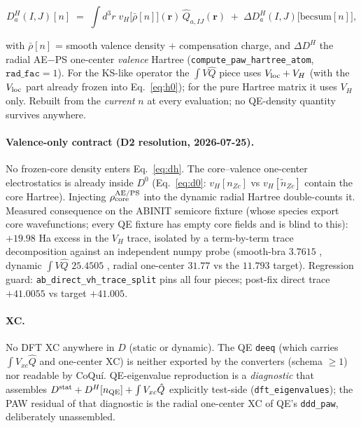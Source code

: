 \documentclass[11pt]{article}
\newcommand{\code}[1]{\texttt{#1}}
\newcommand{\Dstat}{D^{\rm stat}}
\newcommand{\Qhat}{\hat{Q}}
\newcommand{\becsum}{\mathrm{becsum}}
\begin{document}
\begin{keybox}
\begin{equation}
D^{H}_{a}(I,J)[n] \;=\;
\int \! d^3r\; v_H\big[\bar\rho[n]\big](\mathbf{r})\, \Qhat_{a,IJ}(\mathbf{r})
\;+\; \Delta D^{H}_{a}(I,J)\big[\becsum[n]\big],
\label{eq:dh}
\end{equation}
\end{keybox}
with $\bar\rho[n]$ = smooth valence density + compensation charge, and
$\Delta D^H$ the radial AE$-$PS one-center \emph{valence} Hartree
(\code{compute\_paw\_hartree\_atom}, $\code{rad\_fac}=1$). For the KS-like
operator the $\int V \Qhat$ piece uses $V_{\rm loc}+V_H$ (with the
$V_{\rm loc}$ part already frozen into Eq.~\eqref{eq:h0}); for the pure
Hartree matrix it uses $V_H$ only. Rebuilt from the \emph{current} $n$ at
every evaluation; no QE-density quantity survives anywhere.

\paragraph{Valence-only contract (D2 resolution, 2026-07-25).}
No frozen-core density enters Eq.~\eqref{eq:dh}. The core--valence
one-center electrostatics is already inside $D^0$
(Eq.~\eqref{eq:d0}: $v_H[n_{Zc}]$ vs $v_H[\tilde n_{Zc}]$ contain the core
Hartree). Injecting $\rho_{\rm core}^{\rm AE/PS}$ into the dynamic radial
Hartree double-counts it. Measured consequence on the ABINIT semicore
fixture (whose species export core wavefunctions; every QE fixture has
empty core fields and is blind to this): $+19.98$ Ha excess in the $V_H$
trace, isolated by a term-by-term trace decomposition against an
independent numpy probe (smooth-bra $3.7615$ \checkmark, dynamic
$\int V\Qhat$ $25.4505$ \checkmark, radial one-center $31.77$ vs the
$11.793$ target). Regression guard: \code{ab\_direct\_vh\_trace\_split}
pins all four pieces; post-fix direct trace $+41.0055$ vs target
$+41.005$.

\paragraph{XC.} No DFT XC anywhere in $D$ (static or dynamic). The QE
\code{deeq} (which carries $\int V_{xc}\Qhat$ and one-center XC) is
neither exported by the converters (schema $\ge 1$) nor readable by
CoQu\'i. QE-eigenvalue reproduction is a \emph{diagnostic} that assembles
$\Dstat + D^H[n_{\rm QE}] + \int V_{xc}\Qhat$ explicitly test-side
(\code{dft\_eigenvalues}); the PAW residual of that diagnostic is the
radial one-center XC of QE's \code{ddd\_paw}, deliberately unassembled.
\end{document}

